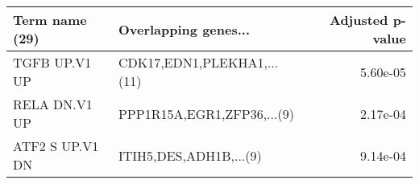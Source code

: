\begin{tabular}{llr}
\toprule
 Term name (29) &       Overlapping genes... &  Adjusted p-value \\
\midrule
  TGFB UP.V1 UP & CDK17,EDN1,PLEKHA1,...(11) &          5.60e-05 \\
  RELA DN.V1 UP & PPP1R15A,EGR1,ZFP36,...(9) &          2.17e-04 \\
ATF2 S UP.V1 DN &     ITIH5,DES,ADH1B,...(9) &          9.14e-04 \\
\bottomrule
\end{tabular}
